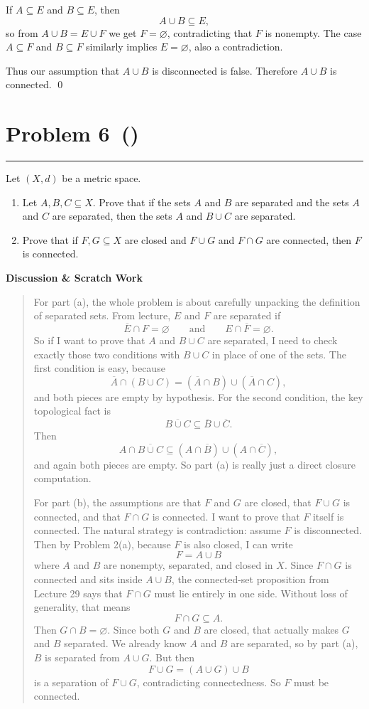 \documentclass[12pt]{article}
\makeatletter
\newenvironment{scratch}{%
  \par\smallskip
  \noindent\textbf{Discussion \& Scratch Work}\begin{quote}\small
}{%
  \end{quote}\smallskip
}
\newcommand{\problem}[2][]{%
  \def\prob@title{Problem #2\if\relax\detokenize{#1}\relax\else\ (\textit{#1})\fi}%
  \phantomsection%
  \pdfbookmark[1]{\prob@title}{prob#2}%
  \addcontentsline{toc}{section}{\prob@title}%
  \section*{\prob@title}%
  \vspace{-0.25em}\hrule\vspace{0.8em}%
}
\makeatother
\begin{document}
If $A\subseteq E$ and $B\subseteq E$, then
\[
A\cup B\subseteq E,
\]
so from $A\cup B=E\cup F$ we get $F=\varnothing$, contradicting that $F$ is nonempty. The case $A\subseteq F$ and $B\subseteq F$ similarly implies $E=\varnothing$, also a contradiction.

Thus our assumption that $A\cup B$ is disconnected is false. Therefore $A\cup B$ is connected.
\qed

\newpage

\problem[]{6}
Let $(X,d)$ be a metric space.
\begin{enumerate}[label=\textbf{(\alph*)}]
  \item Let $A,B,C\subseteq X$. Prove that if the sets $A$ and $B$ are
  separated and the sets $A$ and $C$ are separated, then the sets $A$ and
  $B\cup C$ are separated.
  \item Prove that if $F,G\subseteq X$ are closed and $F\cup G$ and
  $F\cap G$ are connected, then $F$ is connected.
\end{enumerate}

\begin{scratch}
For part (a), the whole problem is about carefully unpacking the definition of separated sets. From lecture, $E$ and $F$ are separated if
\[
\overline{E}\cap F=\varnothing
\qquad\text{and}\qquad
E\cap\overline{F}=\varnothing.
\]
So if I want to prove that $A$ and $B\cup C$ are separated, I need to check exactly those two conditions with $B\cup C$ in place of one of the sets. The first condition is easy, because
\[
\overline{A}\cap (B\cup C)=(\overline{A}\cap B)\cup(\overline{A}\cap C),
\]
and both pieces are empty by hypothesis. For the second condition, the key topological fact is
\[
\overline{B\cup C}\subseteq \overline{B}\cup\overline{C}.
\]
Then
\[
A\cap\overline{B\cup C}\subseteq (A\cap\overline{B})\cup(A\cap\overline{C}),
\]
and again both pieces are empty. So part (a) is really just a direct closure computation.

For part (b), the assumptions are that $F$ and $G$ are closed, that $F\cup G$ is connected, and that $F\cap G$ is connected. I want to prove that $F$ itself is connected. The natural strategy is contradiction: assume $F$ is disconnected. Then by Problem 2(a), because $F$ is also closed, I can write
\[
F=A\cup B
\]
where $A$ and $B$ are nonempty, separated, and closed in $X$. Since $F\cap G$ is connected and sits inside $A\cup B$, the connected-set proposition from Lecture 29 says that $F\cap G$ must lie entirely in one side. Without loss of generality, that means
\[
F\cap G\subseteq A.
\]
Then $G\cap B=\varnothing$. Since both $G$ and $B$ are closed, that actually makes $G$ and $B$ separated. We already know $A$ and $B$ are separated, so by part (a), $B$ is separated from $A\cup G$. But then
\[
F\cup G=(A\cup G)\cup B
\]
is a separation of $F\cup G$, contradicting connectedness. So $F$ must be connected.
\end{scratch}
\end{document}
